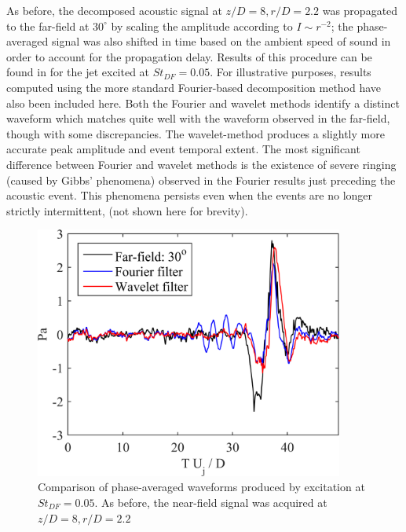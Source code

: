 As before, the decomposed acoustic signal at $z/D = 8, r/D = 2.2$ was propagated to the far-field at $30^\circ$ by scaling the amplitude according to $I \sim r^{-2}$; the phase-averaged signal was also shifted in time based on the ambient speed of sound in order to account for the propagation delay. 
Results of this procedure can be found in  for the jet excited at $St_{DF} = 0.05$. 
For illustrative purposes, results computed using the more standard Fourier-based decomposition method have also been included here.
Both the Fourier and wavelet methods identify a distinct waveform which matches quite well with the waveform observed in the far-field, though with some discrepancies. 
The wavelet-method produces a slightly more accurate peak amplitude and event temporal extent. 
The most significant difference between Fourier and wavelet methods is the existence of severe ringing (caused by Gibbs’ phenomena) observed in the Fourier results just preceding the acoustic event. 
This phenomena persists even when the events are no longer strictly intermittent, (not shown here for brevity). 
\begin{figure}
	\centering
	\includegraphics[width=4in]{Figures/ch3_validation_phavg.png}
	\caption{Comparison of phase-averaged waveforms produced by excitation at $St_{DF} = 0.05$. As before, the near-field signal was acquired at $z/D = 8, r/D = 2.2$}
	\label{fig:ch3_validation_phavg}
\end{figure}

